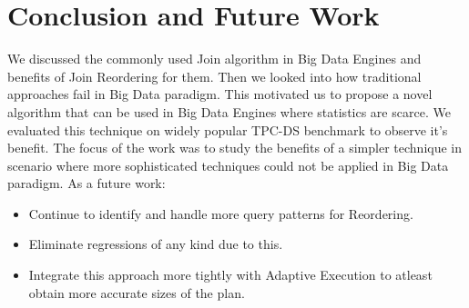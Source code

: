 \section{Conclusion and Future Work}
We discussed the commonly used Join algorithm in Big Data Engines and benefits of Join Reordering for them. Then we looked into how traditional approaches fail in Big Data paradigm. This motivated us to propose a novel algorithm that can be used in Big Data Engines where statistics are scarce. We evaluated this technique on widely popular TPC-DS benchmark to observe it's benefit. The focus of the work was to study the benefits of a simpler technique in scenario where more sophisticated techniques could not be applied in Big Data paradigm. As a future work:

\begin{itemize}
\item Continue to identify and handle more query patterns for Reordering.
\item Eliminate regressions of any kind due to this.
\item Integrate this approach more tightly with Adaptive Execution to atleast obtain more accurate sizes of the plan.
\end{itemize}

